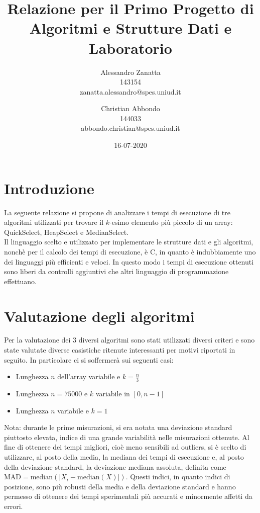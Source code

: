 \documentclass{article}
\title{Relazione per il Primo Progetto di Algoritmi e Strutture Dati e Laboratorio}
\date{16-07-2020}
\author{Alessandro Zanatta \\ 143154 \\ zanatta.alessandro@spes.uniud.it \and Christian Abbondo \\ 144033 \\ abbondo.christian@spes.uniud.it}
\begin{document}
	\maketitle
	\newpage
	
	
	\tableofcontents	
	\newpage
	
	\section{Introduzione}
	La seguente relazione si propone di analizzare i tempi di esecuzione di tre algoritmi utilizzati per trovare il $ k $-esimo elemento più piccolo di un array: QuickSelect, HeapSelect e MedianSelect.
	\\ 
	Il linguaggio scelto e utilizzato per implementare le strutture dati e gli algoritmi, nonchè per il calcolo dei tempi di esecuzione, è C, in quanto è indubbiamente uno dei linguaggi più efficienti e veloci. In questo modo i tempi di esecuzione ottenuti sono liberi da controlli aggiuntivi che altri linguaggio di programmazione effettuano.
	\newpage
	
	
	\section{Valutazione degli algoritmi}
	Per la valutazione dei 3 diversi algoritmi sono stati utilizzati diversi criteri e sono state valutate diverse casistiche ritenute interessanti per motivi riportati in seguito. In particolare ci si soffermerà sui seguenti casi:
	
	\begin{itemize}
		\item Lunghezza $n$ dell'array variabile e $k=\frac{n}{3}$
		\item Lunghezza $n=75000$ e $k$ variabile in $[0,n-1]$
		\item Lunghezza $n$ variabile e $k=1$
	\end{itemize}
	
	Nota: durante le prime misurazioni, si era notata una deviazione standard piuttosto elevata, indice di una grande variabilità nelle misurazioni ottenute. Al fine di ottenere dei tempi migliori, cioè meno sensibili ad outliers, si è scelto di utilizzare, al posto della media, la mediana dei tempi di esecuzione e, al posto della deviazione standard, la deviazione mediana assoluta, definita come $\textrm{MAD}=\textrm{median}\left(\mathopen|X_{i}-\textrm{median}\left(X\right)\mathopen|\right)$. Questi indici, in quanto indici di posizione, sono più robusti della media e della deviazione standard e hanno permesso di ottenere dei tempi sperimentali più accurati e minormente affetti da errori.
	\newpage
	
\end{document}
